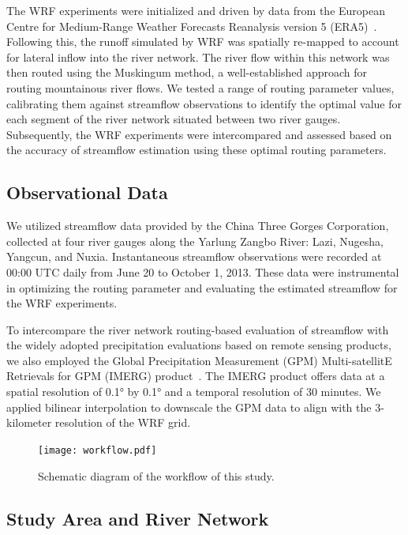 \documentclass[draft]{agujournal2019}
\begin{document}
The WRF experiments were initialized and driven by data from the European Centre for Medium-Range Weather Forecasts Reanalysis version 5 (ERA5)~\cite{hersbach2020QJRMS}. Following this, the runoff simulated by WRF was spatially re-mapped to account for lateral inflow into the river network. The river flow within this network was then routed using the Muskingum method, a well-established approach for routing mountainous river flows. We tested a range of routing parameter values, calibrating them against streamflow observations to identify the optimal value for each segment of the river network situated between two river gauges. Subsequently, the WRF experiments were intercompared and assessed based on the accuracy of streamflow estimation using these optimal routing parameters.

\subsection{Observational Data}
\label{sec:data}

We utilized streamflow data provided by the China Three Gorges Corporation, collected at four river gauges along the Yarlung Zangbo River: Lazi, Nugesha, Yangcun, and Nuxia. Instantaneous streamflow observations were recorded at 00:00 UTC daily from June 20 to October 1, 2013. These data were instrumental in optimizing the routing parameter and evaluating the estimated streamflow for the WRF experiments.

To intercompare the river network routing-based evaluation of streamflow with the widely adopted precipitation evaluations based on remote sensing products, we also employed the Global Precipitation Measurement (GPM) Multi-satellitE Retrievals for GPM (IMERG) product~\cite{huffman2019GPM}. The IMERG product offers data at a spatial resolution of 0.1° by 0.1° and a temporal resolution of 30 minutes. We applied bilinear interpolation to downscale the GPM data to align with the 3-kilometer resolution of the WRF grid.

\begin{figure}[h!]
  \centering
  \noindent\texttt{[image: workflow.pdf]}
  \caption{Schematic diagram of the workflow of this study.}
  \label{fig:workflow}
\end{figure}

\subsection{Study Area and River Network}
\label{sec:domain}
\end{document}
